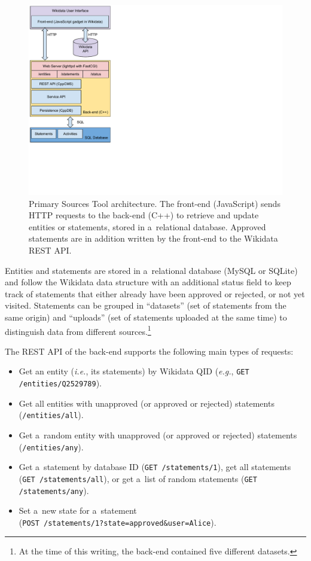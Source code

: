 \documentclass{acm_proc_article-sp}
\begin{document}
\begin{figure}[!htbp]
    \centering
    \includegraphics[width=.65\columnwidth]{img/architecture.pdf}
    \caption{Primary Sources Tool architecture. The front-end (JavaScript) sends
      HTTP requests to the back-end (C++) to retrieve and update entities or
      statements, stored in a~relational database. Approved statements are in
      addition written by the front-end to the Wikidata REST API.}    
    \label{fig:architecture}
\end{figure}

Entities and statements are stored in a~relational database (MySQL or SQLite)
and follow the Wikidata data structure with an additional status field
to keep track of statements that either already have been approved or rejected,
or not yet visited.
Statements can be grouped in ``datasets'' (set of statements from the same origin)
and ``uploads'' (set of statements uploaded at the same time) to
distinguish data from different sources.\footnote{At the time of this writing,
the back-end contained five different datasets.}

The REST API of the back-end supports the following main types of requests:

\begin{itemize}
  \setlength\itemsep{0em}
  \item Get an entity (\emph{i.e.}, its statements) by Wikidata QID
  (\emph{e.g.}, \verb|GET /entities/Q2529789|).
  \item Get all entities with unapproved (or approved or rejected) statements
  (\verb|/entities/all|).
  \item Get a~random entity with unapproved (or approved or rejected) statements
  (\verb|/entities/any|).
  \item Get a~statement by database ID (\verb|GET /statements/1|), get all
    statements (\verb|GET /statements/all|), or get a~list of
  random statements (\verb|GET /statements/any|).
  \item Set a~new state for a~statement \\(\verb|POST /statements/1?state=approved&user=Alice|).
\end{itemize}
\end{document}
